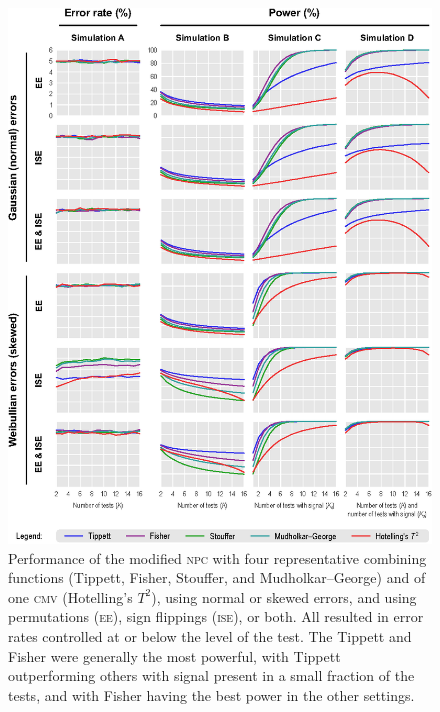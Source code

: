 \begin{figure}[p]
\begin{center}
\centerline{\includegraphics{images/performance.eps}}
\end{center}
\vspace{-3mm}
\caption[Performance of the modified \textsc{npc} using different combining functions, compared to Hotelling's $T^2$.]{Performance of the modified \textsc{npc} with four representative combining functions (Tippett, Fisher, Stouffer, and Mudholkar--George) and of one \textsc{cmv} (Hotelling's $T^2$), using normal or skewed errors, and using permutations (\textsc{ee}), sign flippings (\textsc{ise}), or both. All resulted in error rates controlled at or below the level of the test. The Tippett and Fisher were generally the most powerful, with Tippett outperforming others with signal present in a small fraction of the tests, and with Fisher having the best power in the other settings.}
\label{fig:comb:performance}
\end{figure}

